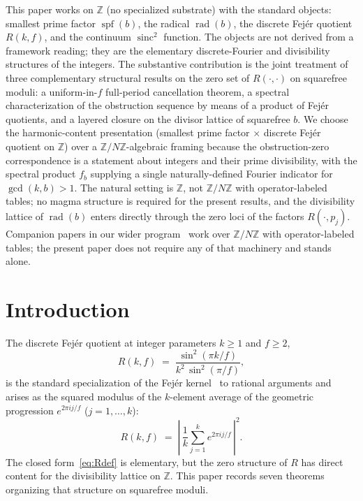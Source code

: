 \documentclass[11pt,reqno]{amsart}
\theoremstyle{plain}
\theoremstyle{definition}
\theoremstyle{remark}
\DeclareMathOperator{\spf}{spf}
\DeclareMathOperator{\sinc}{sinc}
\DeclareMathOperator{\rad}{rad}
\newcommand{\Z}{\mathbb{Z}}
\begin{document}
This paper works on $\Z$ (no specialized substrate) with the standard
objects: smallest prime factor $\spf(b)$, the radical $\rad(b)$, the
discrete Fej\'{e}r quotient $R(k, f)$, and the continuum
$\sinc^{2}$ function. The objects are not derived from a framework
reading; they are the elementary discrete-Fourier and divisibility
structures of the integers. The substantive contribution is the joint
treatment of three complementary structural results on the zero set of
$R(\cdot, \cdot)$ on squarefree moduli: a uniform-in-$f$ full-period
cancellation theorem, a spectral characterization of the obstruction
sequence by means of a product of Fej\'{e}r quotients, and a layered
closure on the divisor lattice of squarefree $b$. We choose the
harmonic-content presentation (smallest prime factor $\times$ discrete
Fej\'{e}r quotient on $\Z$) over a $\Z/N\Z$-algebraic framing because
the obstruction-zero correspondence is a statement about integers and
their prime divisibility, with the spectral product $f_{b}$ supplying
a single naturally-defined Fourier indicator for $\gcd(k, b) > 1$.
The natural setting is $\Z$, not $\Z/N\Z$ with operator-labeled tables;
no magma structure is required for the present results, and the
divisibility lattice of $\rad(b)$ enters directly through the zero loci
of the factors $R(\cdot, p_{j})$. Companion papers in our wider
program~\cite{SandersGish2026Sigma,SandersGish2026FourCore} work over
$\Z/N\Z$ with operator-labeled tables; the present paper does not
require any of that machinery and stands alone.

\section{Introduction}\label{sec:intro}

The discrete Fej\'{e}r quotient at integer parameters $k \ge 1$ and
$f \ge 2$,
\begin{equation}\label{eq:Rdef}
  R(k, f) \;=\; \frac{\sin^{2}(\pi k/f)}{k^{2}\,\sin^{2}(\pi/f)},
\end{equation}
is the standard specialization of the Fej\'{e}r
kernel~\cite{Fejer1900,Zygmund2002} to rational arguments and arises
as the squared modulus of the $k$-element average of the geometric
progression $e^{2\pi i j/f}$ ($j = 1, \dots, k$):
\begin{equation}\label{eq:Rgeom}
  R(k, f)
  \;=\;
  \left|\,\frac{1}{k}\sum_{j=1}^{k} e^{2\pi i j/f}\,\right|^{2}.
\end{equation}
The closed form~\eqref{eq:Rdef} is elementary, but the zero structure
of $R$ has direct content for the divisibility lattice on $\Z$.
This paper records seven theorems organizing that structure on
squarefree moduli.
\end{document}
